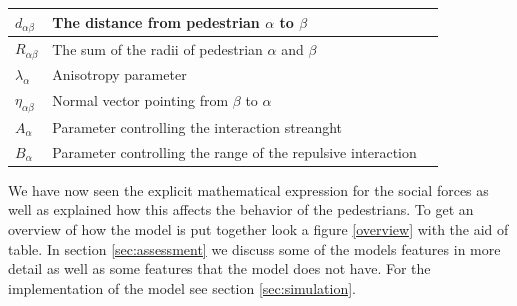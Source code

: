 \begin{center}
\begin{tabular}{lll}
\hline
$d_{\alpha \beta}$& The distance from pedestrian $\alpha$ to $\beta$ &\\
\hline
$R_{\alpha\beta}$& The sum of the radii of pedestrian $\alpha$ and $\beta$ \\
\hline
$\lambda_{\alpha}$& Anisotropy parameter &\\
\hline
$\eta_{\alpha \beta}$& Normal vector pointing from $\beta$ to $\alpha$ \\
\hline
$A_{\alpha}$& Parameter controlling the interaction streanght \\
\hline
$B_{\alpha}$& Parameter controlling the range of the repulsive interaction  \\
\hline
\end{tabular}
\end{center}

We have now seen the explicit mathematical expression for the social forces 
as well as explained how this affects the behavior of the pedestrians. To get an 
overview of how the model is put together look a figure \ref{overview} with 
the aid of table. In section \ref{sec:assessment} 
we discuss some of the models features in more detail as well as some features 
that the model does not have. For the implementation of the model see section \ref{sec:simulation}.

